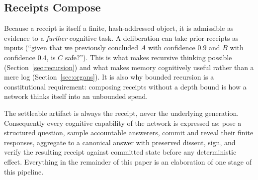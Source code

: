 \subsection{Receipts Compose}

Because a receipt is itself a finite, hash-addressed object, it is admissible as evidence to a \emph{further} cognitive task. A deliberation can take prior \PoT{} receipts as inputs (``given that we previously concluded $A$ with confidence $0.9$ and $B$ with confidence $0.4$, is $C$ safe?''). This is what makes recursive thinking possible (Section~\ref{sec:recursion}) and what makes memory cognitively useful rather than a mere log (Section~\ref{sec:organs}). It is also why bounded recursion is a constitutional requirement: composing receipts without a depth bound is how a network thinks itself into an unbounded spend.

\begin{principle}
\label{prin:settle}
The settle\-able artifact is always the receipt, never the underlying generation. Consequently every cognitive capability of the network is expressed as: pose a structured question, sample accountable answerers, commit and reveal their finite responses, aggregate to a canonical answer with preserved dissent, sign, and verify the resulting receipt against committed state before any deterministic effect. Everything in the remainder of this paper is an elaboration of one stage of this pipeline.
\end{principle}

